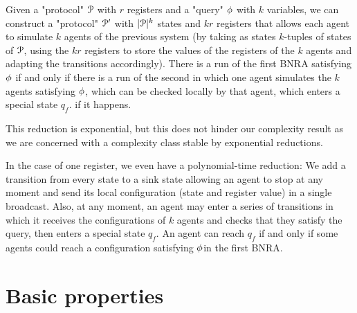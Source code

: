 \begin{remark}
	Given a "protocol" $\mathcal{P}$ with $r$ registers and a "query" $\phi$ with $k$ variables, we can construct a "protocol" $\mathcal{P}'$ with $|\mathcal{P}|^k$ states and $kr$ registers that allows each agent to simulate $k$ agents of the previous system (by taking as states $k$-tuples of states of $\mathcal{P}$, using the $kr$ registers to store the values of the registers of the $k$ agents and adapting the transitions accordingly).
	There is a run of the first BNRA satisfying $\phi$ if and only if there is a run of the second in which one agent simulates the $k$ agents satisfying $\phi$, which can be checked locally by that agent, which enters a special state $q_f$. if it happens. 
	
	This reduction is exponential, but this does not hinder our complexity result as we are concerned with a complexity class stable by exponential reductions.
	
	In the case of one register, we even have a polynomial-time reduction: We add a transition from every state to a sink state allowing an agent to stop at any moment and send its local configuration (state and register value) in a single broadcast.
	Also, at any moment, an agent may enter a series of transitions in which it receives the configurations of $k$ agents and checks that they satisfy the query, then enters a special state $q_f$. An agent can reach $q_f$ if and only if some agents could reach a configuration satisfying $\phi$in the first BNRA.
\end{remark}

	
\ifbasic
\section{Basic properties}



